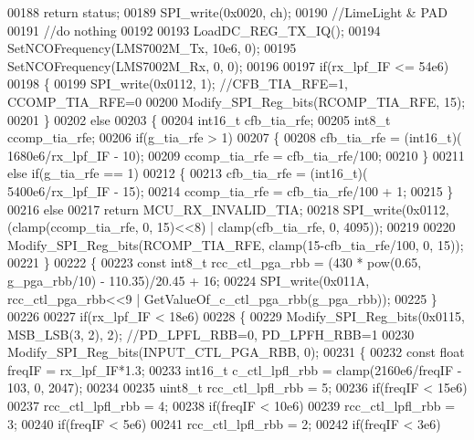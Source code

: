 \begin{DoxyCode}
00188         \textcolor{keywordflow}{return} status;
00189     SPI_write(0x0020, ch);
00190     \textcolor{comment}{//LimeLight & PAD}
00191     \textcolor{comment}{//do nothing}
00192 
00193     LoadDC_REG_TX_IQ();
00194     SetNCOFrequency(LMS7002M_Tx, 10e6, 0);
00195     SetNCOFrequency(LMS7002M_Rx, 0, 0);
00196 
00197     \textcolor{keywordflow}{if}(rx\_lpf\_IF <= 54e6)
00198     \{
00199         SPI_write(0x0112, 1); \textcolor{comment}{//CFB\_TIA\_RFE=1, CCOMP\_TIA\_RFE=0}
00200         Modify_SPI_Reg_bits(RCOMP_TIA_RFE, 15);
00201     \}
00202     \textcolor{keywordflow}{else}
00203     \{
00204         int16\_t cfb\_tia\_rfe;
00205         int8\_t ccomp\_tia\_rfe;
00206         \textcolor{keywordflow}{if}(g\_tia\_rfe > 1)
00207         \{
00208             cfb\_tia\_rfe = (int16\_t)( 1680e6/rx\_lpf\_IF - 10);
00209             ccomp\_tia\_rfe = cfb\_tia\_rfe/100;
00210         \}
00211         \textcolor{keywordflow}{else} \textcolor{keywordflow}{if}(g\_tia\_rfe == 1)
00212         \{
00213             cfb\_tia\_rfe = (int16\_t)( 5400e6/rx\_lpf\_IF - 15);
00214             ccomp\_tia\_rfe = cfb\_tia\_rfe/100 + 1;
00215         \}
00216         \textcolor{keywordflow}{else}
00217             \textcolor{keywordflow}{return} MCU_RX_INVALID_TIA;
00218         SPI_write(0x0112, (clamp(ccomp\_tia\_rfe, 0, 15)<<8) | clamp(cfb\_tia\_rfe, 0, 4095));
00219 
00220         Modify_SPI_Reg_bits(RCOMP_TIA_RFE, clamp(15-cfb\_tia\_rfe/100, 0, 15));
00221     \}
00222     \{
00223         \textcolor{keyword}{const} int8\_t rcc\_ctl\_pga\_rbb = (430 * pow(0.65, g\_pga\_rbb/10) - 110.35)/20.45 + 16;
00224         SPI_write(0x011A, rcc\_ctl\_pga\_rbb<<9 | GetValueOf_c_ctl_pga_rbb(g\_pga\_rbb));
00225     \}
00226 
00227     \textcolor{keywordflow}{if}(rx\_lpf\_IF < 18e6)
00228     \{
00229         Modify_SPI_Reg_bits(0x0115, MSB_LSB(3, 2), 2); \textcolor{comment}{//PD\_LPFL\_RBB=0, PD\_LPFH\_RBB=1}
00230         Modify_SPI_Reg_bits(INPUT_CTL_PGA_RBB, 0);
00231         \{
00232             \textcolor{keyword}{const} \textcolor{keywordtype}{float} freqIF = rx\_lpf\_IF*1.3;
00233             int16\_t c\_ctl\_lpfl\_rbb = clamp(2160e6/freqIF - 103, 0, 2047);
00234 
00235             uint8\_t rcc\_ctl\_lpfl\_rbb = 5;
00236             \textcolor{keywordflow}{if}(freqIF < 15e6)
00237                 rcc\_ctl\_lpfl\_rbb = 4;
00238             \textcolor{keywordflow}{if}(freqIF < 10e6)
00239                 rcc\_ctl\_lpfl\_rbb = 3;
00240             \textcolor{keywordflow}{if}(freqIF < 5e6)
00241                 rcc\_ctl\_lpfl\_rbb = 2;
00242             \textcolor{keywordflow}{if}(freqIF < 3e6)

\end{DoxyCode}
